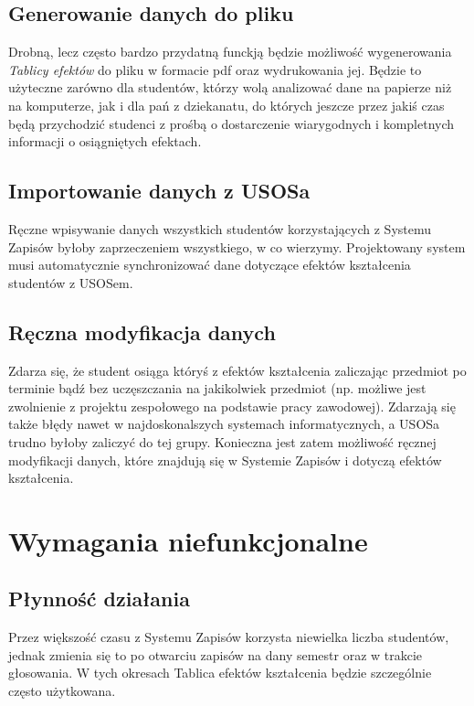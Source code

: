 \documentclass{article}
\begin{document}
\subsection{Generowanie danych do pliku}
Drobną, lecz często bardzo przydatną funckją będzie możliwość wygenerowania \textit{Tablicy efektów} do pliku w formacie pdf oraz wydrukowania jej.
Będzie to użyteczne zarówno dla studentów, którzy wolą analizować dane na papierze niż na komputerze, jak i dla pań z dziekanatu, do których jeszcze przez jakiś czas będą przychodzić studenci z prośbą o dostarczenie wiarygodnych i kompletnych informacji o osiągniętych efektach.

\subsection{Importowanie danych z USOSa}
Ręczne wpisywanie danych wszystkich studentów korzystających z Systemu Zapisów byłoby zaprzeczeniem wszystkiego, w co wierzymy.
Projektowany system musi automatycznie synchronizować dane dotyczące efektów kształcenia studentów z USOSem.


\subsection{Ręczna modyfikacja danych}
Zdarza się, że student osiąga któryś z efektów kształcenia zaliczając przedmiot po terminie bądź bez uczęszczania na jakikolwiek przedmiot (np. możliwe jest zwolnienie z projektu zespołowego na podstawie pracy zawodowej).
Zdarzają się także błędy nawet w najdoskonalszych systemach informatycznych, a USOSa trudno byłoby zaliczyć do tej grupy.
Konieczna jest zatem możliwość ręcznej modyfikacji danych, które znajdują się w Systemie Zapisów i dotyczą efektów kształcenia.



\section{Wymagania niefunkcjonalne}

\subsection{Płynność działania}
Przez większość czasu z Systemu Zapisów korzysta niewielka liczba studentów, jednak zmienia się to po otwarciu zapisów na dany semestr oraz w trakcie głosowania.
W tych okresach Tablica efektów kształcenia będzie szczególnie często użytkowana.
\end{document}
